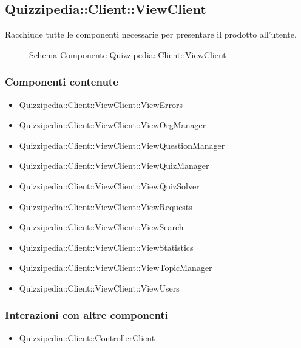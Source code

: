 \subsection{Quizzipedia::Client::ViewClient}
Racchiude tutte le componenti necessarie per presentare il prodotto all'utente.
\begin{figure}[H]
\centering
\noindent{}
\caption[Schema Componente Quizzipedia::Client::ViewClient]{Schema Componente Quizzipedia::Client::ViewClient}
\end{figure}
\subsubsection{Componenti contenute}
\begin{itemize}
\item Quizzipedia::Client::ViewClient::ViewErrors
\item Quizzipedia::Client::ViewClient::ViewOrgManager
\item Quizzipedia::Client::ViewClient::ViewQuestionManager
\item Quizzipedia::Client::ViewClient::ViewQuizManager
\item Quizzipedia::Client::ViewClient::ViewQuizSolver
\item Quizzipedia::Client::ViewClient::ViewRequests
\item Quizzipedia::Client::ViewClient::ViewSearch
\item Quizzipedia::Client::ViewClient::ViewStatistics
\item Quizzipedia::Client::ViewClient::ViewTopicManager
\item Quizzipedia::Client::ViewClient::ViewUsers
\end{itemize}
\subsubsection{Interazioni con altre componenti}
\begin{itemize}
\item Quizzipedia::Client::ControllerClient
\end{itemize}
